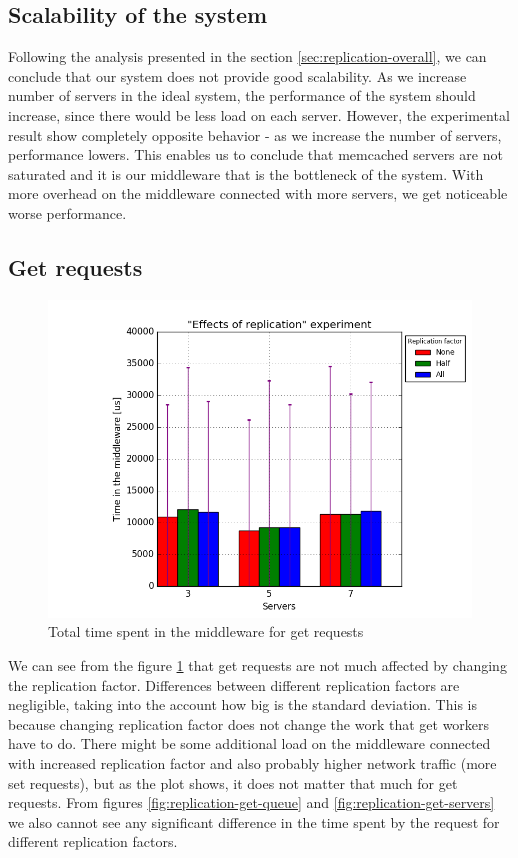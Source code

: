 \documentclass[11pt]{article}
\begin{document}
\subsection{Scalability of the system}
Following the analysis presented in the section \ref{sec:replication-overall}, we can conclude that our system does not provide good scalability. As we increase number of servers in the ideal system, the performance of the system should increase, since there would be less load on each server. However, the experimental result show completely opposite behavior - as we increase the number of servers, performance lowers. This enables us to conclude that memcached servers are not saturated and it is our middleware that is the bottleneck of the system. With more overhead on the middleware connected with more servers, we get noticeable worse performance.  


\subsection{Get requests}
\begin{figure}
\centering
	\includegraphics[width=0.7\linewidth]{plots/replication-get}

\caption{Total time spent in the middleware for get requests}
\label{fig:replication-get}
\end{figure}

We can see from the figure \ref{fig:replication-get} that get requests are not much affected by changing the replication factor. Differences between different replication factors are negligible, taking into the account how big is the standard deviation. This is because changing replication factor does not change the work that get workers have to do. There might be some additional load on the middleware connected with increased replication factor and also probably higher network traffic (more set requests), but as the plot shows, it does not matter that much for get requests. From figures \ref{fig:replication-get-queue} and \ref{fig:replication-get-servers} we also cannot see any significant difference in the time spent by the request for different replication factors.
\end{document}
